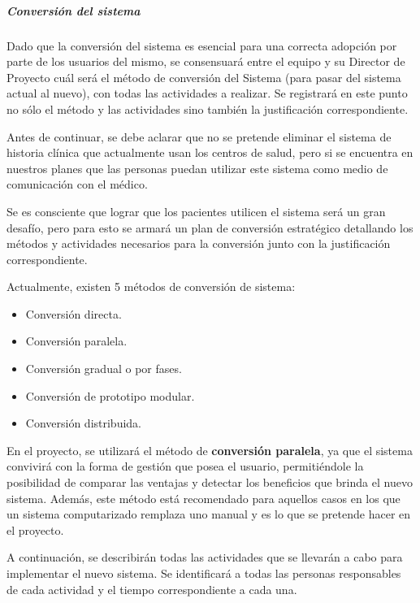 \subparagraph{Conversión del sistema}

Dado que la conversión del sistema es esencial para una correcta adopción por parte de los usuarios del mismo, se consensuará entre el equipo y su Director de Proyecto cuál será el método de conversión del Sistema (para pasar del sistema actual al nuevo), con todas las actividades a realizar.
Se registrará en este punto no sólo el método y las actividades sino también la justificación correspondiente.

Antes de continuar, se debe aclarar que no se pretende eliminar el sistema de historia clínica que actualmente usan los centros de salud, pero si se encuentra en nuestros planes que las personas puedan utilizar este sistema como medio de comunicación con el médico.

Se es consciente que lograr que los pacientes utilicen el sistema será un gran desafío, pero para esto se armará un plan de conversión estratégico detallando los métodos y actividades necesarios para la conversión junto con la justificación correspondiente.

Actualmente, existen 5 métodos de conversión de sistema:
\begin{itemize}
    \item Conversión directa.
    \item Conversión paralela.
    \item Conversión gradual o por fases.
    \item Conversión de prototipo modular.
    \item Conversión distribuida.
\end{itemize}

En el proyecto, se utilizará el método de \textbf{conversión paralela}, ya que el sistema convivirá con la forma de gestión que posea el usuario, permitiéndole la posibilidad  de comparar las ventajas y detectar los beneficios que brinda el nuevo sistema.
Además, este método está recomendado para aquellos casos en los que un sistema computarizado remplaza uno manual y es lo que se pretende hacer en el proyecto.

A continuación, se describirán todas las actividades que se llevarán a cabo para implementar el nuevo sistema.
Se identificará a todas las personas responsables de cada actividad y el tiempo correspondiente a cada una.


